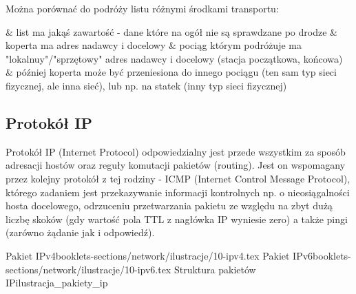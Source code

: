 \begin{teacherOnly} Można porównać do podróży listu różnymi środkami transportu:
	\begin{easylist}[itemize]
		& list ma jakąś zawartość - dane które na ogół nie są sprawdzane po drodze
		& koperta ma adres nadawcy i docelowy
		& pociąg którym podróżuje ma "lokalnuy"/"sprzętowy" adres nadawcy i docelowy (stacja początkowa, końcowa)
		& później koperta może być przeniesiona do innego pociągu (ten sam typ sieci fizycznej, ale inna sieć), lub np. na statek (inny typ sieci fizycznej)
	\end{easylist}
\end{teacherOnly}


\subsection{Protokół IP}

Protokół IP (Internet Protocol) odpowiedzialny jest przede wszystkim za sposób adresacji hostów oraz reguły komutacji pakietów (routing). Jest on wspomagany przez kolejny protokół z tej rodziny - ICMP (Internet Control Message Protocol), którego zadaniem jest przekazywanie informacji kontrolnych np. o nieosiągalności hosta docelowego, odrzuceniu przetwarzania pakietu ze względu na zbyt dużą liczbę skoków (gdy wartość pola TTL z nagłówka IP wyniesie zero) a także pingi (zarówno żądanie jak i odpowiedź).

	{Pakiet IPv4}{booklets-sections/network/ilustracje/10-ipv4.tex}
	{Pakiet IPv6}{booklets-sections/network/ilustracje/10-ipv6.tex}
	{Struktura pakietów IP}{ilustracja_pakiety_ip}
